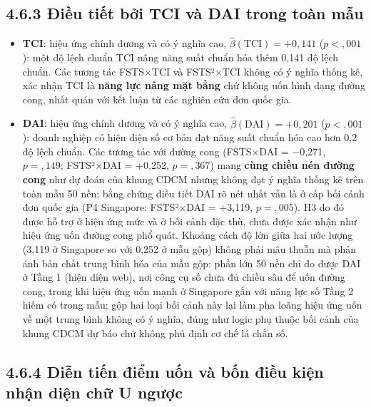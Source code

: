 \documentclass[
  a4paper,
  13pt]{extreport}
\providecommand{\tightlist}{%
  \setlength{\itemsep}{0pt}\setlength{\parskip}{0pt}}
\begin{document}
\hypertarget{ux111iux1ec1u-tiux1ebft-bux1edfi-tci-vuxe0-dai-trong-touxe0n-mux1eabu}{%
\subsection{4.6.3 Điều tiết bởi TCI và DAI trong toàn
mẫu}\label{ux111iux1ec1u-tiux1ebft-bux1edfi-tci-vuxe0-dai-trong-touxe0n-mux1eabu}}

\begin{itemize}
\tightlist
\item
  \textbf{TCI}: hiệu ứng chính dương và có ý nghĩa cao,
  \(\hat{\beta}(\text{TCI}) = +0{,}141\) (\(p < {,}001\)): một độ lệch
  chuẩn TCI nâng năng suất chuẩn hóa thêm 0,141 độ lệch chuẩn. Các tương
  tác FSTS×TCI và FSTS²×TCI không có ý nghĩa thống kê, xác nhận TCI là
  \textbf{năng lực nâng mặt bằng} chứ không uốn hình dạng đường cong,
  nhất quán với kết luận từ các nghiên cứu đơn quốc gia.
\item
  \textbf{DAI}: hiệu ứng chính dương và có ý nghĩa cao,
  \(\hat{\beta}(\text{DAI}) = +0{,}201\) (\(p < {,}001\)): doanh nghiệp
  có hiện diện số cơ bản đạt năng suất chuẩn hóa cao hơn 0,2 độ lệch
  chuẩn. Các tương tác với đường cong (FSTS×DAI = −0,271,
  \(p = {,}149\); FSTS²×DAI = +0,252, \(p = {,}367\)) mang \textbf{cùng
  chiều nén đường cong} như dự đoán của khung CDCM nhưng không đạt ý
  nghĩa thống kê trên toàn mẫu 50 nền; bằng chứng điều tiết DAI rõ nét
  nhất vẫn là ở cấp bối cảnh đơn quốc gia (P4 Singapore: FSTS²×DAI =
  +3,119, \(p = {,}005\)). H3 do đó được hỗ trợ ở hiệu ứng mức và ở bối
  cảnh đặc thù, chưa được xác nhận như hiệu ứng uốn đường cong phổ quát.
  Khoảng cách độ lớn giữa hai ước lượng (3,119 ở Singapore so với 0,252
  ở mẫu gộp) không phải mâu thuẫn mà phản ánh bản chất trung bình hóa
  của mẫu gộp: phần lớn 50 nền chỉ đo được DAI ở Tầng 1 (hiện diện web),
  nơi công cụ số chưa đủ chiều sâu để uốn đường cong, trong khi hiệu ứng
  uốn mạnh ở Singapore gắn với năng lực số Tầng 2 hiếm có trong mẫu; gộp
  hai loại bối cảnh này lại làm pha loãng hiệu ứng uốn về một trung bình
  không có ý nghĩa, đúng như logic phụ thuộc bối cảnh của khung CDCM dự
  báo chứ không phủ định cơ chế lá chắn số.
\end{itemize}

\hypertarget{diux1ec5n-tiux1ebfn-ux111iux1ec3m-uux1ed1n-vuxe0-bux1ed1n-ux111iux1ec1u-kiux1ec7n-nhux1eadn-diux1ec7n-chux1eef-u-ngux1b0ux1ee3c}{%
\subsection{4.6.4 Diễn tiến điểm uốn và bốn điều kiện nhận diện chữ U
ngược}\label{diux1ec5n-tiux1ebfn-ux111iux1ec3m-uux1ed1n-vuxe0-bux1ed1n-ux111iux1ec1u-kiux1ec7n-nhux1eadn-diux1ec7n-chux1eef-u-ngux1b0ux1ee3c}}
\end{document}
